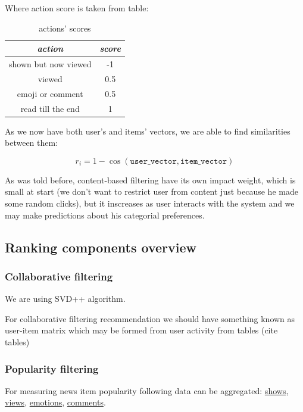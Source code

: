 \documentclass{article}
\begin{document}
Where action score is taken from table:

\begin{table}[h]
    \centering
    \begin{tabular}{cc}
        \toprule
        \textit{action} & \textit{score} \\
        \midrule
        shown but now viewed & -1 \\
        viewed & 0.5 \\
        emoji or comment & 0.5 \\
        read till the end & 1 \\
        \bottomrule
    \end{tabular}%
    \caption{actions' scores}
    \label{tab:action_score}
\end{table}

As we now have both user's and items' vectors, we are able to find similarities between them:

\begin{equation}
    r_i = 1 - \cos{(\texttt{user\_vector}, \texttt{item\_vector})}
\end{equation}


As was told before, content-based filtering have its own impact weight, which is small at start (we don't want to restrict user from content just because he made some random clicks), but it inscreases as user interacts with the system and we may make predictions about his categorial preferences.

\subsection{Ranking components overview}



\subsubsection{Collaborative filtering}

We are using SVD++ algorithm.

For collaborative filtering recommendation we should have something known as user-item matrix which may be formed from user activity from tables (cite tables)

\subsubsection{Popularity filtering}

For measuring news item popularity following data can be aggregated: \hyperref[tab:show]{shows}, \hyperref[tab:view]{views}, \hyperref[tab:emotion]{emotions}, \hyperref[tab:comment]{comments}.
\end{document}
